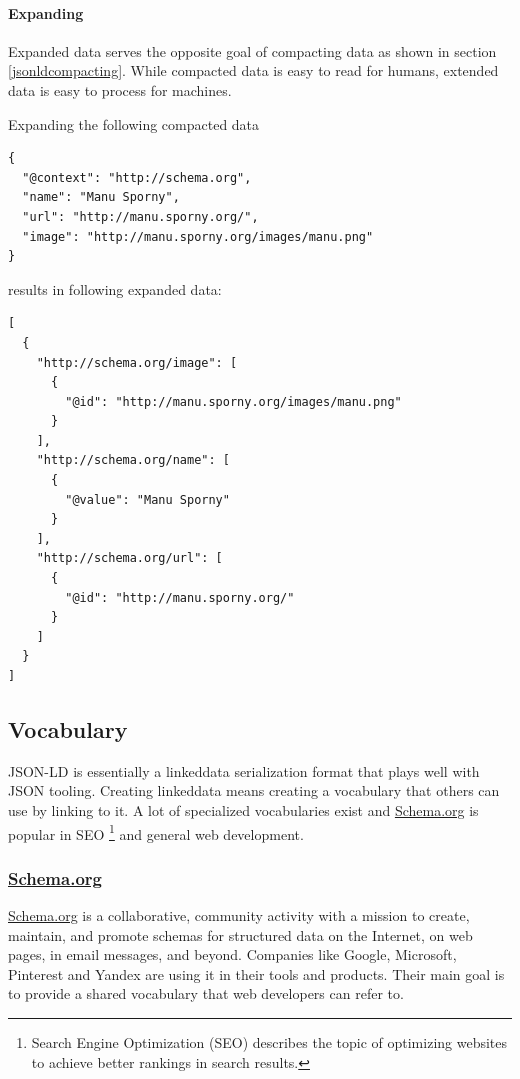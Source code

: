 \paragraph{Expanding}\label{jsonldextending}
Expanded data serves the opposite goal of compacting data as shown in section \ref{jsonldcompacting}. While compacted data is easy to read for humans, extended data is easy to process for machines.

Expanding the following compacted data

\lstset{language=JSON}
\begin{lstlisting}[caption=Compacted and easy-to-read data of a person. \citep{jsonldbasicconcepts}]
{
  "@context": "http://schema.org",
  "name": "Manu Sporny",
  "url": "http://manu.sporny.org/",
  "image": "http://manu.sporny.org/images/manu.png"
}
\end{lstlisting}

results in following expanded data:

\lstset{language=JSON}
\begin{lstlisting}[caption=Expanded data of a person that is easy to process for machines. \citep{jsonldbasicconcepts}]
[
  {
    "http://schema.org/image": [
      {
        "@id": "http://manu.sporny.org/images/manu.png"
      }
    ],
    "http://schema.org/name": [
      {
        "@value": "Manu Sporny"
      }
    ],
    "http://schema.org/url": [
      {
        "@id": "http://manu.sporny.org/"
      }
    ]
  }
]
\end{lstlisting}

\subsection{Vocabulary}
JSON-LD is essentially a \gls{linkeddata} serialization format that plays well with JSON tooling. Creating \gls{linkeddata} means creating a vocabulary that others can use by linking to it. A lot of specialized vocabularies exist and \url{Schema.org} is popular in SEO \footnote{Search Engine Optimization (SEO) describes the topic of optimizing websites to achieve better rankings in search results.} and general web development.

\subsubsection{\url{Schema.org}}\label{schemaorg}
\url{Schema.org} is a collaborative, community activity with a mission to create, maintain, and promote schemas for structured data on the Internet, on web pages, in email messages, and beyond. \citep{welcomeschemaorg} Companies like Google, Microsoft, Pinterest and Yandex are using it in their tools and products.
Their main goal is to provide a shared vocabulary that web developers can refer to.

